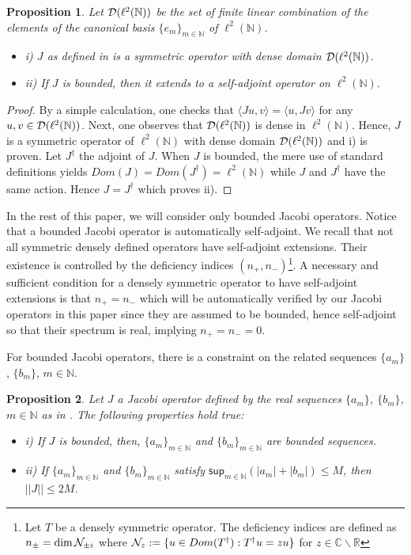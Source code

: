 \documentclass[10pt]{book}
\renewcommand{\sup}{\mathsf{sup}}
\theoremstyle{break}
\newtheorem{proposition}{Proposition}
\begin{document}
\begin{proposition}
Let ${\cal{D}}(\ell^2(\mathbb{N}))$ be the set of finite linear combination of the elements of the canonical basis $\{e_m\}_{m\in\mathbb{N}}$ of $\ell^2(\mathbb{N})$.
\begin{itemize}
\vspace*{-3pt}
\setlength{\itemsep}{-1pt}
\item i) $J$ as defined in %
is a symmetric operator with dense domain ${\cal{D}}(\ell^2(\mathbb{N}))$.
\item ii) If $J$ is bounded, then it extends to a self-adjoint operator on $\ell^2(\mathbb{N})$.
\end{itemize}
\end{proposition}
\begin{proof}
By a simple calculation, one checks that $\langle Ju,v \rangle=\langle u,Jv \rangle$ for any $u,v\in{\cal{D}}(\ell^2(\mathbb{N}))$. Next, one observes that ${\cal{D}}(\ell^2(\mathbb{N}))$ is dense in $\ell^2(\mathbb{N})$. Hence, $J$ is a symmetric operator of $\ell^2(\mathbb{N})$ with dense domain ${\cal{D}}(\ell^2(\mathbb{N}))$ and i) is proven. Let $J^\dag$ the adjoint of $J$. When $J$ is bounded, the mere use of standard definitions yields $Dom(J)=Dom(J^\dag)=\ell^2(\mathbb{N})$ while $J$ and $J^\dag$ have the same action. Hence 
$J=J^\dag$ which proves ii).
\end{proof}
In the rest of this paper, we will consider only bounded Jacobi operators. Notice that a bounded Jacobi operator is automatically self-adjoint. We recall that not all symmetric densely defined operators have self-adjoint extensions. Their existence is controlled by the deficiency indices $(n_+,n_-)${\footnote{Let $T$ be a densely symmetric operator. The deficiency indices are defined as $n_\pm=\dim{\cal{N}}_{\pm i}$ where ${\cal{N}}_z:=\{u\in Dom(T^\dag):T^\dag u=zu \}$ for $z\in\mathbb{C}\backslash\mathbb{R}$}}. A necessary and sufficient condition for a densely symmetric operator to have self-adjoint extensions is that $n_+=n_-$ which will be automatically verified by our Jacobi operators in this paper since they are  assumed to be bounded, hence self-adjoint so that their spectrum is real, implying $n_+=n_-=0$.\par
For bounded Jacobi operators, there is a constraint on the related sequences $\{a_m\}$, $\{b_m\}$, $m\in\mathbb{N}$.
\begin{proposition}
Let $J$ a Jacobi operator defined by the real sequences $\{a_m\}$, $\{b_m\}$, $m\in\mathbb{N}$ as in %
. The following properties hold true:
\begin{itemize}
\vspace*{-3pt}
\setlength{\itemsep}{-1pt}
\item i) If $J$ is bounded, then, $\{a_m\}_{m\in\mathbb{N}}$ and $\{b_m\}_{m\in\mathbb{N}}$ are bounded sequences.
\item ii) If $\{a_m\}_{m\in\mathbb{N}}$ and $\{b_m\}_{m\in\mathbb{N}}$ satisfy $\sup_{m\in\mathbb{N}}(|a_m|+|b_m|)\le M$, then $||J||\le2 M$.
\end{itemize}
\end{proposition}
\end{document}
